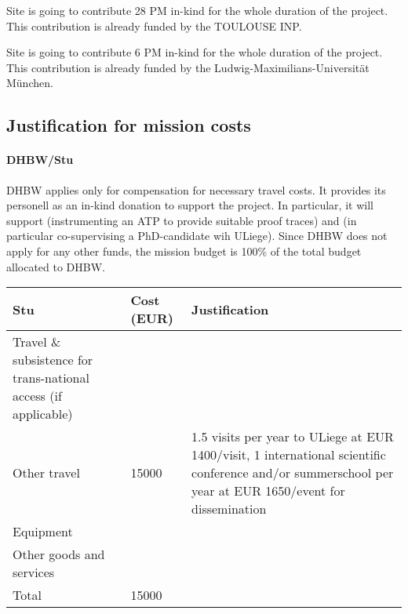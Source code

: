 Site  is going to contribute 28 PM in-kind for the whole duration of the project.
This contribution is already funded by the TOULOUSE INP.

Site  is going to contribute 6 PM in-kind for the whole duration of the project.
This contribution is already funded by the Ludwig-Maximilians-Universit\"at M\"unchen.


\subsection*{Justification for mission costs}

\paragraph*{DHBW/Stu}

DHBW applies only for compensation for necessary travel costs. It
provides its personell as an in-kind donation to support the
project. In particular, it will support  (instrumenting
an ATP to provide suitable proof traces) and  (in
particular co-supervising a PhD-candidate wih ULiege). Since DHBW does
not apply for any other funds, the mission budget is 100\% of the
total budget allocated to DHBW.

\medskip

\noindent
\begin{tabular}{|p{9em}|l|p{}|}
\hline
  Stu & Cost (EUR)  & Justification \\
  \hline
  Travel \& subsistence for trans-national access (if applicable) & & \\
  \hline
  Other travel & 15000 & 1.5 visits per year to ULiege at EUR
                         1400/visit, 1 international scientific
                         conference and/or summerschool per year at
                         EUR 1650/event for dissemination \\
  \hline
  Equipment & & \\
  \hline
  Other goods and services & & \\
  \hline
  \hline
  Total & 15000 & \\
  \hline
\end{tabular}






